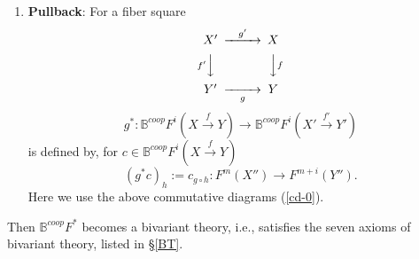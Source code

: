 \documentclass[a4paper]{amsart}
\begin{document}
\begin{thm}
\begin{enumerate}
$$f_*: \mathbb B^{coop}F^i(X \xrightarrow {g \circ f} Z) \to \mathbb B^{coop}F^i(Y \xrightarrow g Z)$$
is defined by, for $c \in \mathbb B^{coop}F^i(X \xrightarrow {g \circ f} Z)$ 
$$(f_*c)_h := c_h \circ (f')^*: F^m(Y') \xrightarrow{(f')^*} F^m(X')  \xrightarrow{c_h} F^{m+i}(Z').$$
Here we use the above commutative diagram (\ref{cd-1}).
\item {\bf Pullback}: For a fiber square 
$$\CD
X' @> {g'}  >> X\\
@V {f'} VV @VV fV\\
Y' @>> {g} > Y\\
\endCD
$$
$$g^*: \mathbb B^{coop}F^i(X \xrightarrow f Y ) \to \mathbb B^{coop}F^i(X' \xrightarrow {f'} Y' )$$
is defined by, for $c \in \mathbb B^{coop}F^i(X \xrightarrow f Y) $
$$(g^*c)_h := c_{g \circ h}: F^m(X'') \to F^{m+i}(Y'').$$
Here we use the above commutative diagrams (\ref{cd-0}).
\end{enumerate} 
Then 
$\mathbb B^{coop}F^*$
becomes a bivariant theory, i.e., satisfies the seven axioms of bivariant theory, listed in \S \ref{BT}.
\end{thm}
\end{document}
